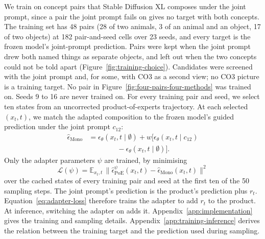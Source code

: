 \documentclass{article} %
\newcommand{\trainpairs}{48}
\newcommand{\statesperrun}{ten}
\begin{document}
We train on concept pairs that Stable Diffusion XL composes under the joint prompt, since a pair the joint prompt fails on gives no target with both concepts. The training set has \trainpairs{} pairs (28 of two animals, 3 of an animal and an object, 17 of two objects) at 182 pair-and-seed cells over 23 seeds, and every target is the frozen model's joint-prompt prediction. Pairs were kept when the joint prompt drew both named things as separate objects, and left out when the two concepts could not be told apart (Figure~\ref{fig:training-choice}). Candidates were screened with the joint prompt and, for some, with CO3 \citep{dutta2026steer} as a second view; no CO3 picture is a training target. No pair in Figure~\ref{fig:four-pairs-four-methods} was trained on. Seeds 9 to 16 are never trained on.
For every training pair and seed, we select \statesperrun{} states
from an uncorrected product-of-experts trajectory. At each selected
$(x_t,t)$, we match the adapted composition to the frozen model's
guided prediction under the joint prompt $c_{12}$:
\begin{equation}
\begin{aligned}
\hat\epsilon_{\mathrm{Mono}}
&=
\epsilon_\theta(x_t,t\mid\emptyset)
+
w\bigl[
\epsilon_\theta(x_t,t\mid c_{12}) \\
&\qquad\qquad
-
\epsilon_\theta(x_t,t\mid\emptyset)
\bigr].
\end{aligned}
\label{eq:mono-target}
\end{equation}
Only the adapter parameters $\psi$ are trained, by minimising
\begin{equation}
\mathcal L(\psi)=\mathbb E_{x_t,t}\,\bigl\|\hat\epsilon^{\psi}_{\mathrm{PoE}}(x_t,t)-\hat\epsilon_{\mathrm{Mono}}(x_t,t)\bigr\|^2
\label{eq:adapter-loss}
\end{equation}
over the cached states of every training pair and seed at the first ten of the 50 sampling steps. The joint prompt's prediction is the product's prediction plus $r_t$. Equation~\ref{eq:adapter-loss} therefore trains the adapter to add $r_t$ to the product. At inference, switching the adapter on adds it.
Appendix~\ref{app:implementation} gives the training and sampling
details. Appendix~\ref{app:training-inference} derives the relation
between the training target and the prediction used during sampling.
\end{document}
